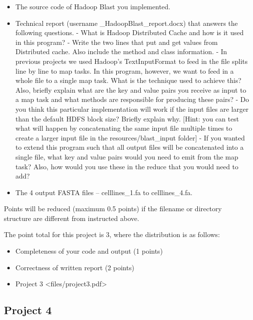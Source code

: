 \begin{itemize}

\item
  The source code of Hadoop Blast you implemented.
\item
  Technical report (username \_HadoopBlast\_report.docx) that answers
  the following questions. - What is Hadoop Distributed Cache and how is
  it used in this program? - Write the two lines that put and get values
  from Distributed cache. Also include the method and class information.
  - In previous projects we used Hadoop's TextInputFormat to feed in the
  file splits line by line to map tasks. In this program, however, we
  want to feed in a whole file to a single map task. What is the
  technique used to achieve this? Also, briefly explain what are the key
  and value pairs you receive as input to a map task and what methods
  are responsible for producing these pairs? - Do you think this
  particular implementation will work if the input files are larger than
  the default HDFS block size? Briefly explain why. {[}Hint: you can
  test what will happen by concatenating the same input file multiple
  times to create a larger input file in the resources/blast\_input
  folder{]} - If you wanted to extend this program such that all output
  files will be concatenated into a single file, what key and value
  pairs would you need to emit from the map task? Also, how would you
  use these in the reduce that you would need to add?
\item
  The 4 output FASTA files -- celllines\_1.fa to celllines\_4.fa.
\end{itemize}

Points will be reduced (maximum 0.5 points) if the filename or directory
structure are different from instructed above.

The point total for this project is 3, where the distribution is as
follows:

\begin{itemize}

\item
  Completeness of your code and output (1 points)
\item
  Correctness of written report (2 points)
\item
  Project 3 \textless{}files/project3.pdf\textgreater{}
\end{itemize}

\subsection{Project 4}\label{project-4}

